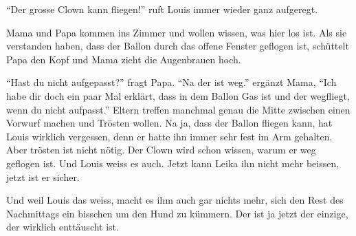 \enquote{Der grosse Clown kann fliegen!} ruft Louis immer wieder ganz aufgeregt.

Mama und Papa kommen ins Zimmer und wollen wissen, was hier los ist. Als sie verstanden haben, dass der Ballon durch das offene Fenster geflogen ist, schüttelt Papa den Kopf und Mama zieht die Augenbrauen hoch.

\enquote{Hast du nicht aufgepasst?} fragt Papa. \enquote{Na der ist weg.} ergänzt Mama, \enquote{Ich habe dir doch ein paar Mal erklärt, dass in dem Ballon Gas ist und der wegfliegt, wenn du nicht aufpasst.} Eltern treffen manchmal genau die Mitte zwischen einen Vorwurf machen und Trösten wollen. Na ja, dass der Ballon fliegen kann, hat Louis wirklich vergessen, denn er hatte ihn immer sehr fest im Arm gehalten. Aber trösten ist nicht nötig. Der Clown wird schon wissen, warum er weg geflogen ist. Und Louis weiss es auch. Jetzt kann Leika ihn nicht mehr beissen, jetzt ist er sicher.

Und weil Louis das weiss, macht es ihm auch gar nichts mehr, sich den Rest des Nachmittags ein bisschen um den Hund zu kümmern. Der ist ja jetzt der einzige, der wirklich enttäuscht ist.

 \hfill {\color{DeepPink}\decofourleft}
